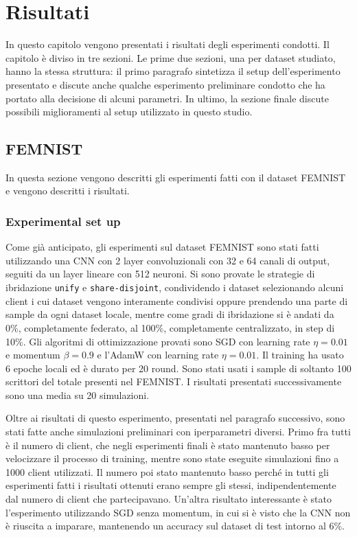 \chapter{Risultati}
In questo capitolo vengono presentati i risultati degli esperimenti 
condotti. Il capitolo è diviso in tre sezioni.
Le prime due sezioni, una per dataset studiato, hanno la stessa 
struttura: il primo paragrafo sintetizza il 
setup dell'esperimento presentato e discute anche qualche esperimento
preliminare condotto che ha portato alla decisione di alcuni parametri.
In ultimo, la sezione finale discute possibili miglioramenti al setup
utilizzato in questo studio.


\section{FEMNIST}
In questa sezione vengono descritti gli esperimenti fatti con il dataset
FEMNIST e vengono descritti i risultati.

\subsection{Experimental set up}
Come già anticipato, gli esperimenti sul dataset FEMNIST sono stati fatti 
utilizzando una CNN con 2 layer convoluzionali con 32 e 64 canali di 
output, seguiti da un layer lineare con 512 neuroni. Si sono provate le 
strategie di ibridazione \texttt{unify} e \texttt{share-disjoint},
condividendo i dataset selezionando alcuni client i cui dataset 
vengono interamente condivisi oppure prendendo una parte di sample da 
ogni dataset locale, mentre come gradi di ibridazione si è andati da 0\%,
completamente federato, al 100\%, completamente centralizzato,
in step di 10\%. Gli algoritmi di ottimizzazione provati sono SGD 
con learning rate \(\eta = 0.01\) e momentum \(\beta = 0.9\) e l'AdamW
con learning rate \(\eta = 0.01\). Il training ha usato 6 epoche locali
ed è durato per 20 round. Sono stati usati i sample di soltanto 100 
scrittori del totale presenti nel FEMNIST. I risultati presentati 
successivamente sono una media su 20 simulazioni.

Oltre ai risultati di questo esperimento, presentati nel paragrafo
successivo, sono stati fatte anche simulazioni preliminari con 
iperparametri diversi. Primo fra tutti è il numero di client, che negli 
esperimenti finali è stato mantenuto basso per velocizzare il processo 
di training, mentre sono state eseguite simulazioni fino a 1000 client 
utilizzati. Il numero poi stato mantenuto basso perché in tutti gli 
esperimenti fatti i risultati ottenuti erano sempre gli stessi, 
indipendentemente dal numero di client che partecipavano.
Un'altra risultato interessante è stato l'esperimento utilizzando SGD
senza momentum, in cui si è visto che la CNN non è riuscita a imparare,
mantenendo un accuracy sul dataset di test intorno al 6\%.

